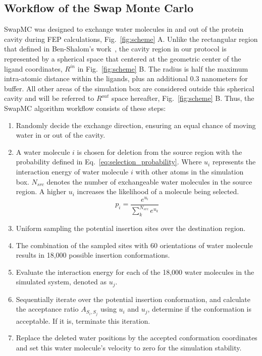 \documentclass[journal=jacsat,manuscript=article]{achemso}
\begin{document}
\subsection{Workflow of the Swap Monte Carlo}
SwapMC was designed to exchange water molecules in and out of the protein cavity during FEP calculations, Fig.~\ref{fig:scheme} A.
Unlike the rectangular region that defined in Ben-Shalom's work~\cite{ben2021fast}, 
the cavity region in our protocol is represented by a spherical space that centered at the geometric center of the ligand coordinates, $R^{in}$ in Fig.~\ref{fig:scheme} B.
The radius is half the maximum intra-atomic distance within the ligands, plus an additional 0.3 nanometers for buffer.
All other areas of the simulation box are considered outside this spherical cavity and will be referred to $R^{out}$ space hereafter, Fig.~\ref{fig:scheme} B.
Thus, the SwapMC algorithm workflow consists of these steps:
\begin{enumerate}
  \item Randomly decide the exchange direction, ensuring an equal chance of moving water in or out of the cavity.
  \item A water molecule $i$ is chosen for deletion from the source region with the probability defined in Eq.~\ref{eq:selection_probability}. 
    Where $u_i$ represents the interaction energy of water molecule $i$ with other atoms in the simulation box. 
    $N_{src}$ denotes the number of exchangeable water molecules in the source region. A higher $u_i$ increases the likelihood of a molecule being selected.
  \begin{equation}\label{eq:selection_probability}
    p_i = \frac{e^{u_i}}{\sum^{N_{src}}_k{e^{u_k}}}    
  \end{equation}
  \item Uniform sampling the potential insertion sites over the destination region.
  \item The combination of the sampled sites with 60 orientations of water molecule results in 18,000 possible insertion conformations.
  \item Evaluate the interaction energy for each of the 18,000 water molecules in the simulated system, denoted as $u_j$.
  \item Sequentially iterate over the potential insertion conformation, and calculate the acceptance ratio $A_{S_i, S_j}$ using $u_i$ and $u_j$, determine if the conformation is acceptable. 
  If it is, terminate this iteration.
  \item Replace the deleted water positions by the accepted conformation coordinates and set this water molecule's velocity to zero for the simulation stability.
\end{enumerate}
\end{document}
